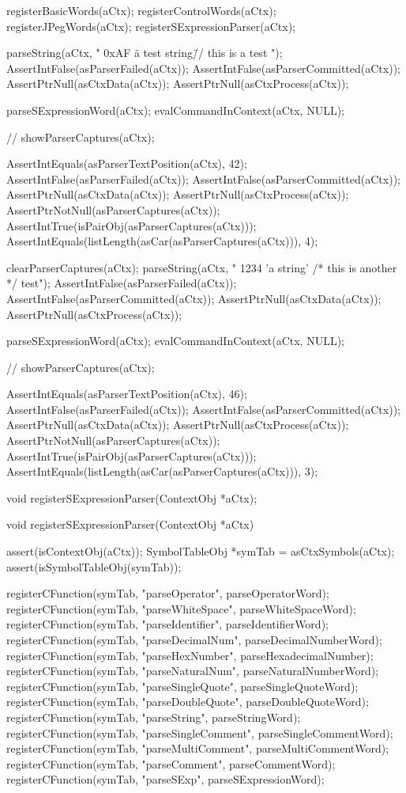   registerBasicWords(aCtx);
  registerControlWords(aCtx);
  registerJPegWords(aCtx);
  registerSExpressionParser(aCtx);
  
  parseString(aCtx, " 0xAF \"a test string\" // this is \n a test ");
  AssertIntFalse(asParserFailed(aCtx));
  AssertIntFalse(asParserCommitted(aCtx));
  AssertPtrNull(asCtxData(aCtx));
  AssertPtrNull(asCtxProcess(aCtx));
  
  parseSExpressionWord(aCtx);
  evalCommandInContext(aCtx, NULL);
  
//  showParserCaptures(aCtx);
  
  AssertIntEquals(asParserTextPosition(aCtx), 42);
  AssertIntFalse(asParserFailed(aCtx));
  AssertIntFalse(asParserCommitted(aCtx));
  AssertPtrNull(asCtxData(aCtx));
  AssertPtrNull(asCtxProcess(aCtx));
  AssertPtrNotNull(asParserCaptures(aCtx));
  AssertIntTrue(isPairObj(asParserCaptures(aCtx)));
  AssertIntEquals(listLength(asCar(asParserCaptures(aCtx))), 4);
  
  clearParserCaptures(aCtx);
  parseString(aCtx, " 1234 'a string' /* this is \n another  */ test");
  AssertIntFalse(asParserFailed(aCtx));
  AssertIntFalse(asParserCommitted(aCtx));
  AssertPtrNull(asCtxData(aCtx));
  AssertPtrNull(asCtxProcess(aCtx));
  
  parseSExpressionWord(aCtx);
  evalCommandInContext(aCtx, NULL);
  
//  showParserCaptures(aCtx);
  
  AssertIntEquals(asParserTextPosition(aCtx), 46);
  AssertIntFalse(asParserFailed(aCtx));
  AssertIntFalse(asParserCommitted(aCtx));
  AssertPtrNull(asCtxData(aCtx));
  AssertPtrNull(asCtxProcess(aCtx));
  AssertPtrNotNull(asParserCaptures(aCtx));
  AssertIntTrue(isPairObj(asParserCaptures(aCtx)));
  AssertIntEquals(listLength(asCar(asParserCaptures(aCtx))), 3);
\stopCTest
\stopTestCase
\stopTestSuite

\startCHeader
void registerSExpressionParser(ContextObj *aCtx);
\stopCHeader

\startCCode
void registerSExpressionParser(ContextObj *aCtx) {
  assert(isContextObj(aCtx));
  SymbolTableObj *symTab = asCtxSymbols(aCtx);
  assert(isSymbolTableObj(symTab));
  
  registerCFunction(symTab, "parseOperator",      parseOperatorWord);
  registerCFunction(symTab, "parseWhiteSpace",    parseWhiteSpaceWord);
  registerCFunction(symTab, "parseIdentifier",    parseIdentifierWord);
  registerCFunction(symTab, "parseDecimalNum",    parseDecimalNumberWord);
  registerCFunction(symTab, "parseHexNumber",     parseHexadecimalNumber);
  registerCFunction(symTab, "parseNaturalNum",    parseNaturalNumberWord);
  registerCFunction(symTab, "parseSingleQuote",   parseSingleQuoteWord);
  registerCFunction(symTab, "parseDoubleQuote",   parseDoubleQuoteWord);
  registerCFunction(symTab, "parseString",        parseStringWord);
  registerCFunction(symTab, "parseSingleComment", parseSingleCommentWord);
  registerCFunction(symTab, "parseMultiComment",  parseMultiCommentWord);
  registerCFunction(symTab, "parseComment",       parseCommentWord);
  registerCFunction(symTab, "parseSExp",          parseSExpressionWord);
}
\stopCCode
